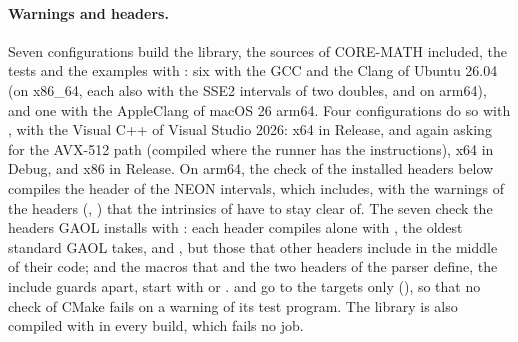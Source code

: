 \paragraph{Warnings and headers.} Seven configurations build the library, the
sources of CORE-MATH included, the tests and the examples with
: six with the GCC and the Clang of Ubuntu 26.04
(on x86\_64, each also with the SSE2 intervals of two doubles, and on arm64),
and one with the AppleClang of macOS 26 arm64. Four configurations do so with , with the Visual C++ of Visual Studio 2026: x64
in Release, and again asking for the AVX-512 path (compiled where the runner has
the instructions), x64 in Debug, and x86 in
Release. On arm64, the check of the installed headers below compiles the header
of the NEON intervals, which  includes,
with the warnings of the headers (,
) that the intrinsics of  have to stay clear
of.\newinvfive{} The
seven check the headers GAOL installs with
: each header compiles alone with
, the oldest standard GAOL takes, and
, but those that other
headers include in the middle of their code; and the
macros that  and the two headers of the parser define, the
include guards apart, start with  or .
 and  go to the targets only
(), so that no check of CMake
fails on a warning of its test program. The library is also compiled with
 in every build, which fails no job.

